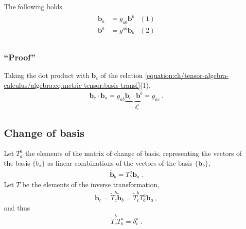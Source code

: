 \documentclass[letterpaper,10pt,english]{jupyterBook}
\begin{document}
\sphinxAtStartPar
The following holds
\begin{equation}\label{equation:ch/tensor-algebra-calculus/algebra:eq:metric-tensor:basis-transf}
\begin{split}\begin{aligned}
  \mathbf{b}_a & = g_{ab} \mathbf{b}^b & (1) \\
  \mathbf{b}^a & = g^{ab} \mathbf{b}_b & (2) \\
\end{aligned}\end{split}
\end{equation}\subsubsection*{“Proof”}

\sphinxAtStartPar
Taking the dot product with \(\mathbf{b}_c\) of the relation \eqref{equation:ch/tensor-algebra-calculus/algebra:eq:metric-tensor:basis-transf}(1),
\begin{equation*}
\begin{split}\mathbf{b}_c \cdot \mathbf{b}_a = g_{ab} \underbrace{\mathbf{b}_c \cdot \mathbf{b}^b}_{=\delta_c^b} = g_{ac} \ .\end{split}
\end{equation*}

\subsection{Change of basis}
\label{\detokenize{ch/tensor-algebra-calculus/algebra:change-of-basis}}
\sphinxAtStartPar
Let \(T_{a}^b\) the elements of the matrix of change of basis, representing the vectors of the basis \(\{ \widetilde{b}_a \}\) as linear combinations of the vectors of the basis \(\{ \mathbf{b}_b \}\),
\begin{equation*}
\begin{split}\widetilde{\mathbf{b}}_b = T_b^a \mathbf{b}_a \ .\end{split}
\end{equation*}
\sphinxAtStartPar
{} Let \(\widetilde{T}\) be the elements of the inverse transformation,
\begin{equation*}
\begin{split}\mathbf{b}_c = \widetilde{T}_{c}^{b} \widetilde{\mathbf{b}}_b = \widetilde{T}_{c}^{b}  T_b^a \mathbf{b}_a \ ,\end{split}
\end{equation*}
\sphinxAtStartPar
and thus
\begin{equation*}
\begin{split}\widetilde{T}_{c}^{b}  T_b^a = \delta_{c}^a \ .\end{split}
\end{equation*}
\sphinxAtStartPar
{} 
\end{document}
